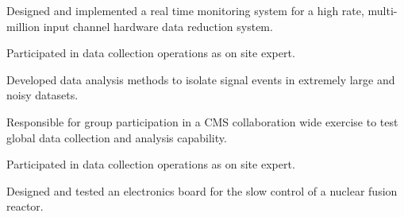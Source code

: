 \documentclass[a4paper]{deedy-resume} %
\begin{document}
\begin{minipage}[t]{0.62\textwidth}
\sectionspace %



\begin{tightitemize}
\item Designed and implemented a real time monitoring system for a high rate, multi-million input channel hardware data reduction system.
\item Participated in data collection operations as on site expert.
\end{tightitemize}

\sectionspace %


\begin{tightitemize}
\item Developed data analysis methods to isolate signal events in extremely large and noisy datasets.
\item Responsible for group participation in a CMS collaboration wide exercise to test global data collection and analysis capability.
\item Participated in data collection operations as on site expert.
\end{tightitemize}

\sectionspace %


\begin{tightitemize}
\item  Designed and tested an electronics board for the slow control of a nuclear fusion reactor.
\end{tightitemize}

\sectionspace %


\end{minipage}
\end{document}
